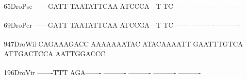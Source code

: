 \documentclass[11pt,twoside,reqno,a4paper]{article}
\begin{document}
{65\hspace*{3\charwidth}DroPse	------GATT	TAATATTCAA	ATCCCA---T	TC--------	----------	----------	\\
\hspace*{5\charwidth}\hspace*{7\charwidth}\hspace*{1\charwidth}\hspace*{1\charwidth}\hspace*{1\charwidth}\hspace*{1\charwidth}\hspace*{1\charwidth}\hspace*{1\charwidth}\\
69\hspace*{3\charwidth}DroPer	------GATT	TAATATTCAA	ATCCGA---T	TC--------	----------	----------	\\
\hspace*{5\charwidth}\hspace*{7\charwidth}\hspace*{1\charwidth}\hspace*{1\charwidth}\hspace*{1\charwidth}\hspace*{1\charwidth}\hspace*{1\charwidth}\hspace*{1\charwidth}\\
947\hspace*{2\charwidth}DroWil	CAGAAAGACC	AAAAAAATAC	ATACAAAATT	GAATTTGTCA	ATTGACTCCA	AATTGGACCC	\\
\hspace*{5\charwidth}\hspace*{7\charwidth}\hspace*{1\charwidth}\hspace*{1\charwidth}\hspace*{1\charwidth}\hspace*{1\charwidth}\hspace*{1\charwidth}\hspace*{1\charwidth}\\
196\hspace*{2\charwidth}DroVir	-------TTT	AGA-------	----------	----------	----------	----------	\\
\hspace*{5\charwidth}\hspace*{7\charwidth}\hspace*{1\charwidth}\hspace*{1\charwidth}\hspace*{1\charwidth}\hspace*{1\charwidth}\hspace*{1\charwidth}\hspace*{1\charwidth}\\
}
\end{document}
